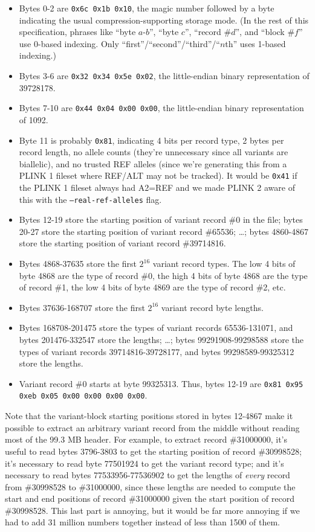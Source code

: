 \documentclass[8pt]{article}
\begin{document}
\begin{itemize}
\item Bytes 0-2 are \texttt{0x6c 0x1b 0x10}, the magic number followed by a
  byte indicating the usual compression-supporting storage mode.  (In the rest
  of this specification, phrases like ``byte $a$-$b$'', ``byte $c$'', ``record
  \#$d$'', and ``block \#$f$'' use 0-based indexing.  Only
  ``first''/``second''/``third''/``$n$th'' uses 1-based indexing.)
\item Bytes 3-6 are \texttt{0x32 0x34 0x5e 0x02}, the little-endian binary
  representation of 39728178.
\item Bytes 7-10 are \texttt{0x44 0x04 0x00 0x00}, the little-endian binary
  representation of 1092.
\item Byte 11 is probably \texttt{0x81}, indicating 4 bits per record type, 2
  bytes per record length, no allele counts (they're unnecessary since all
  variants are biallelic), and no trusted REF alleles (since we're generating
  this from a PLINK 1 fileset where REF/ALT may not be tracked).  It would be
  \texttt{0x41} if the PLINK 1 fileset always had A2=REF and we made PLINK 2
  aware of this with the \texttt{--real-ref-alleles} flag.
\item Bytes 12-19 store the starting position of variant record \#0 in the
  file; bytes 20-27 store the starting position of variant record \#65536;
  \ldots ; bytes 4860-4867 store the starting position of variant record
  \#39714816.
\item Bytes 4868-37635 store the first $2^{16}$ variant record types.  The low
  4 bits of byte 4868 are the type of record \#0, the high 4 bits of byte 4868
  are the type of record \#1, the low 4 bits of byte 4869 are the type of
  record \#2, etc.
\item Bytes 37636-168707 store the first $2^{16}$ variant record byte lengths.
\item Bytes 168708-201475 store the types of variant records 65536-131071, and
  bytes 201476-332547 store the lengths; \ldots ; bytes 99291908-99298588 store
  the types of variant records 39714816-39728177, and bytes 99298589-99325312
  store the lengths.
\item Variant record \#0 starts at byte 99325313.  Thus, bytes 12-19 are
  \texttt{0x81 0x95 0xeb 0x05 0x00 0x00 0x00 0x00}.
\end{itemize}

Note that the variant-block starting positions stored in bytes 12-4867 make it
possible to extract an arbitrary variant record from the middle without reading
most of the 99.3 MB header.  For example, to extract record \#31000000, it's
useful to read bytes 3796-3803 to get the starting position of record
\#30998528; it's necessary to read byte 77501924 to get the variant record
type; and it's necessary to read bytes 77533956-77536902 to get the lengths of
\textit{every} record from \#30998528 to \#31000000, since these lengths are
needed to compute the start and end positions of record \#31000000 given the
start position of record \#30998528.  This last part is annoying, but it would
be far more annoying if we had to add 31 million numbers together instead of
less than 1500 of them.
\end{document}
